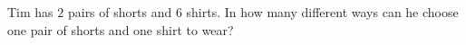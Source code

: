 Tim has $2$ pairs of shorts and $6$ shirts. In how many different ways can he choose one pair of shorts and one shirt to wear?
